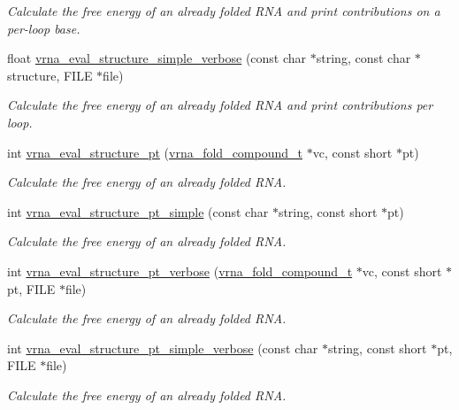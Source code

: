\begin{DoxyCompactItemize}
\begin{DoxyCompactList}\small\item\em Calculate the free energy of an already folded R\+N\+A and print contributions on a per-\/loop base. \end{DoxyCompactList}\item 
float \hyperlink{group__eval_ga4c2895a7dcd756ef2dc7f76db7c4c53e}{vrna\+\_\+eval\+\_\+structure\+\_\+simple\+\_\+verbose} (const char $\ast$string, const char $\ast$structure, F\+I\+L\+E $\ast$file)
\begin{DoxyCompactList}\small\item\em Calculate the free energy of an already folded R\+N\+A and print contributions per loop. \end{DoxyCompactList}\item 
int \hyperlink{group__eval_gadbd09372ddfd7a450bbd590c96a6bfe4}{vrna\+\_\+eval\+\_\+structure\+\_\+pt} (\hyperlink{group__fold__compound_ga1b0cef17fd40466cef5968eaeeff6166}{vrna\+\_\+fold\+\_\+compound\+\_\+t} $\ast$vc, const short $\ast$pt)
\begin{DoxyCompactList}\small\item\em Calculate the free energy of an already folded R\+N\+A. \end{DoxyCompactList}\item 
int \hyperlink{group__eval_ga0bba59b4d6e53461088666ff4aece7b0}{vrna\+\_\+eval\+\_\+structure\+\_\+pt\+\_\+simple} (const char $\ast$string, const short $\ast$pt)
\begin{DoxyCompactList}\small\item\em Calculate the free energy of an already folded R\+N\+A. \end{DoxyCompactList}\item 
int \hyperlink{group__eval_ga8a517cfeeae8c376ae7b1e0c401d38b4}{vrna\+\_\+eval\+\_\+structure\+\_\+pt\+\_\+verbose} (\hyperlink{group__fold__compound_ga1b0cef17fd40466cef5968eaeeff6166}{vrna\+\_\+fold\+\_\+compound\+\_\+t} $\ast$vc, const short $\ast$pt, F\+I\+L\+E $\ast$file)
\begin{DoxyCompactList}\small\item\em Calculate the free energy of an already folded R\+N\+A. \end{DoxyCompactList}\item 
int \hyperlink{group__eval_ga76e152ee9a02be23da14cdddf52b4e44}{vrna\+\_\+eval\+\_\+structure\+\_\+pt\+\_\+simple\+\_\+verbose} (const char $\ast$string, const short $\ast$pt, F\+I\+L\+E $\ast$file)
\begin{DoxyCompactList}\small\item\em Calculate the free energy of an already folded R\+N\+A. \end{DoxyCompactList}\item 

\end{DoxyCompactItemize}
